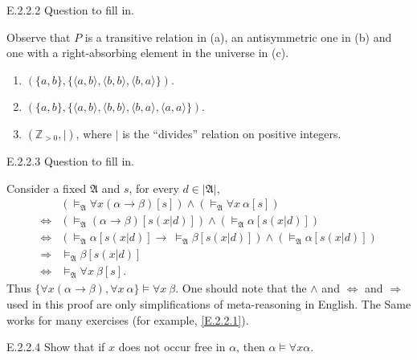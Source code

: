 \begin{exercise}{E.2.2.2}
  Question to fill in.
\end{exercise}

Observe that $P$ is a transitive relation in (a), an antisymmetric one in (b) and one with a right-absorbing element in the universe in (c).
\begin{enumerate}
  \item $(\{a,b\},\{\langle a,b\rangle,\langle b,b\rangle,\langle b,a\rangle\})$.
  \item $(\{a,b\},\{\langle a,b\rangle,\langle b,b\rangle,\langle b,a\rangle,\langle a,a\rangle\})$.
  \item $(\mathbb{Z}_{>0}, |)$, where $|$ is the ``divides'' relation on positive integers.
\end{enumerate}

\begin{exercise}{E.2.2.3}
  Question to fill in.
\end{exercise}

Consider a fixed $\mathfrak{A}$ and $s$, for every $d\in|\mathfrak{A}|$,
\begin{align*}
                  & (\vDash_{\mathfrak{A}}\forall x(\alpha\rightarrow \beta)[s])\wedge(\vDash_{\mathfrak{A}}\forall x\ \alpha[s])                    \\
  \Leftrightarrow & (\vDash_{\mathfrak{A}}(\alpha\rightarrow \beta)[s(x|d)])\wedge(\vDash_{\mathfrak{A}} \alpha[s(x|d)])                             \\
  \Leftrightarrow & (\vDash_{\mathfrak{A}}\alpha[s(x|d)]\rightarrow\ \vDash_{\mathfrak{A}}\beta[s(x|d)])\wedge(\vDash_{\mathfrak{A}} \alpha[s(x|d)]) \\
  \Rightarrow     & \vDash_{\mathfrak{A}}\beta[s(x|d)]                                                                                               \\
  \Leftrightarrow & \vDash_{\mathfrak{A}}\forall x\ \beta[s].
\end{align*}
Thus $\{\forall x(\alpha\rightarrow \beta),\forall x\ \alpha\}\vDash\forall x\ \beta$. One should note that the $\wedge$ and $\Leftrightarrow$ and $\Rightarrow$ used in this proof are only simplifications of meta-reasoning in English. The Same works for many exercises (for example, \ref{E.2.2.1}).

\begin{exercise}{E.2.2.4}
  Show that if $x$ does not occur free in $\alpha$, then $\alpha\vDash\forall x \alpha$.
\end{exercise}

